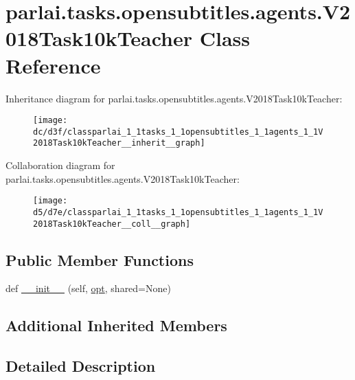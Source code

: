 \hypertarget{classparlai_1_1tasks_1_1opensubtitles_1_1agents_1_1V2018Task10kTeacher}{}\section{parlai.\+tasks.\+opensubtitles.\+agents.\+V2018\+Task10k\+Teacher Class Reference}
\label{classparlai_1_1tasks_1_1opensubtitles_1_1agents_1_1V2018Task10kTeacher}


Inheritance diagram for parlai.\+tasks.\+opensubtitles.\+agents.\+V2018\+Task10k\+Teacher\+:\nopagebreak
\begin{figure}[H]
\begin{center}
\leavevmode
\texttt{[image: dc/d3f/classparlai\_1\_1tasks\_1\_1opensubtitles\_1\_1agents\_1\_1V2018Task10kTeacher\_\_inherit\_\_graph]}
\end{center}
\end{figure}


Collaboration diagram for parlai.\+tasks.\+opensubtitles.\+agents.\+V2018\+Task10k\+Teacher\+:\nopagebreak
\begin{figure}[H]
\begin{center}
\leavevmode
\texttt{[image: d5/d7e/classparlai\_1\_1tasks\_1\_1opensubtitles\_1\_1agents\_1\_1V2018Task10kTeacher\_\_coll\_\_graph]}
\end{center}
\end{figure}
\subsection*{Public Member Functions}
\begin{DoxyCompactItemize}
\item 
def \hyperlink{classparlai_1_1tasks_1_1opensubtitles_1_1agents_1_1V2018Task10kTeacher_af6e78685bc810f960b3d35b1dd1bf281}{\+\_\+\+\_\+init\+\_\+\+\_\+} (self, \hyperlink{classparlai_1_1core_1_1teachers_1_1FbDialogTeacher_af7a9ec497b9cd0292d7b8fa220da7c28}{opt}, shared=None)
\end{DoxyCompactItemize}
\subsection*{Additional Inherited Members}


\subsection{Detailed Description}


